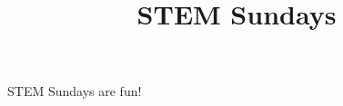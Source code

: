 \documentclass{book}
\title{STEM Sundays}
\begin{document}
    
\maketitle

\tableofcontents


STEM Sundays are fun!



\printindex
\end{document}
